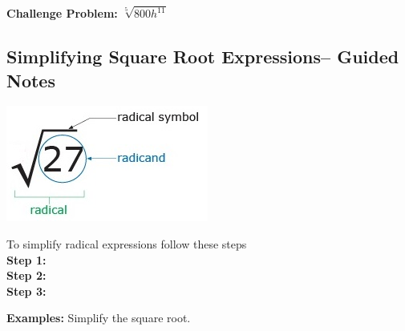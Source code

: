 \documentclass[12pt]{article}
\begin{document}
 \textbf{Challenge Problem:} $\sqrt[5]{800h^{11}}$
 

\pagebreak

\subsection{Simplifying Square Root Expressions-- Guided Notes}

\begin{center}
\includegraphics[scale=.7]{squareroot.jpg}\\
\end{center}

To simplify radical expressions follow these steps\\

\textbf{Step 1:} \\

\textbf{Step 2:} \\

\textbf{Step 3:} \\

\hrulefill

\textbf{Examples:} Simplify the square root.\\
\end{document}
